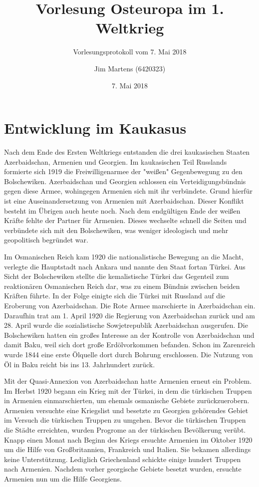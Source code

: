 \documentclass[10pt,a4paper,oneside,ngerman,numbers=noenddot]{scrartcl}
\begin{document}
\author{Jim Martens (6420323)}
\title{Vorlesung Osteuropa im 1. Weltkrieg}
\subtitle{Vorlesungsprotokoll vom 7. Mai 2018}
\date{7. Mai 2018}
\maketitle

\section{Entwicklung im Kaukasus}

Nach dem Ende des Ersten Weltkriegs entstanden die drei kaukasischen Staaten
Azerbaidschan, Armenien und Georgien. Im kaukasischen Teil Russlands formierte
sich 1919 die Freiwilligenarmee der "weißen" Gegenbewegung zu den Bolschewiken.
Azerbaidschan und Georgien schlossen ein Verteidigungsbündnis gegen diese
Armee, wohingegen Armenien sich mit ihr verbündete. Grund hierfür ist eine
Auseinandersetzung von Armenien mit Azerbaidschan. Dieser Konflikt besteht
im Übrigen auch heute noch. Nach dem endgültigen Ende der weißen Kräfte fehlte
der Partner für Armenien. Dieses wechselte schnell die Seiten und verbündete sich
mit den Bolschewiken, was weniger ideologisch und mehr geopolitisch begründet
war.

Im Osmanischen Reich kam 1920 die nationalistische Bewegung an die Macht, verlegte
die Hauptstadt nach Ankara und nannte den Staat fortan Türkei. Aus Sicht der
Bolschewiken stellte die kemalistische Türkei das Gegenteil zum reaktionären
Osmanischen Reich dar, was zu einem Bündnis zwischen beiden Kräften führte.
In der Folge einigte sich die Türkei mit Russland auf die Eroberung von Azerbaidschan.
Die Rote Armee marschierte in Azerbaidschan ein. Daraufhin trat am 1. April 1920
die Regierung von Azerbaidschan zurück und am 28. April wurde die sozialistische
Sowjetrepublik Azerbaidschan ausgerufen. Die Bolschewiken hatten ein großes
Interesse an der Kontrolle von Azerbaidschan und damit Baku, weil sich dort
große Erdölvorkommen befanden. Schon im Zarenreich wurde 1844 eine erste
Ölquelle dort durch Bohrung erschlossen. Die Nutzung von Öl in Baku
reicht bis ins 13. Jahrhundert zurück.

Mit der Quasi-Annexion von Azerbaidschan hatte Armenien erneut ein Problem.
Im Herbst 1920 begann ein Krieg mit der Türkei, in dem die türkischen Truppen
in Armenien einmarschierten, um ehemals osmanische Gebiete zurückzuerobern.
Armenien versuchte eine Kriegslist und besetzte zu Georgien gehörendes Gebiet
im Versuch die türkischen Truppen zu umgehen. Bevor die türkischen Truppen
die Städte erreichten, wurden Progrome an der türkischen Bevölkerung verübt.
Knapp einen Monat nach Beginn des Kriegs ersuchte Armenien im Oktober 1920 um die
Hilfe von Großbritannien, Frankreich und Italien. Sie bekamen allerdings keine
Unterstützung. Lediglich Griechenland schickte einige hundert Truppen nach
Armenien. Nachdem vorher georgische Gebiete besetzt wurden, ersuchte Armenien
nun um die Hilfe Georgiens.
\end{document}
